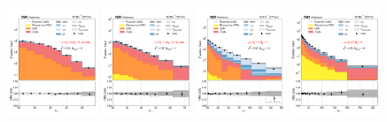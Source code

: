 \begin{figure}[htb!]
    \centering
    \includegraphics[width=0.24\textwidth]{chapters/Analysis/sectionStatisticalAnalysis/figures/fit/mutau_cat_eq0_eq0}
    \includegraphics[width=0.24\textwidth]{chapters/Analysis/sectionStatisticalAnalysis/figures/fit/mutau_cat_eq1_eq0}
    \includegraphics[width=0.24\textwidth]{chapters/Analysis/sectionStatisticalAnalysis/figures/fit/mutau_cat_eq1_eq1}
    \includegraphics[width=0.24\textwidth]{chapters/Analysis/sectionStatisticalAnalysis/figures/fit/mutau_cat_gt2_eq0}


\end{figure}
